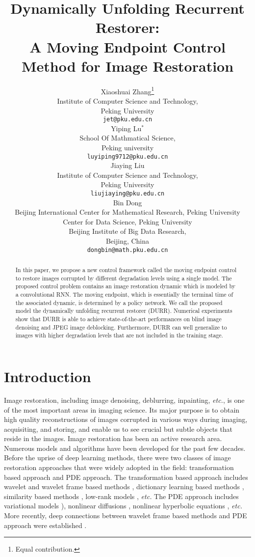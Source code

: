 \documentclass{article} %
\title{Dynamically Unfolding Recurrent Restorer:\\
A Moving Endpoint Control Method for Image Restoration}
\author{
	Xiaoshuai Zhang\thanks{Equal contribution.}\\
	Institute of Computer Science and Technology,\\
	Peking University\\
	\texttt{jet@pku.edu.cn} \\
	\And
	Yiping Lu$^*$ \\
	School Of Mathmatical Science,\\
	Peking university \\
	\texttt{luyiping9712@pku.edu.cn} \\
	\And
	Jiaying Liu \\
	Institute of Computer Science and Technology,\\
	Peking University\\
	\texttt{liujiaying@pku.edu.cn}\\
	\And
	Bin Dong \\
	Beijing International Center for Mathematical Research, Peking University\\
	Center for Data Science, Peking University\\
	Beijing Institute of Big Data Research,\\
	Beijing, China\\
	\texttt{dongbin@math.pku.edu.cn}\\
}
\begin{document}
\maketitle

\begin{abstract}
In this paper, we propose a new control framework called
the moving endpoint control to restore images corrupted by
different degradation levels using a single model. The proposed control problem
contains an image restoration dynamic which is modeled by a convolutional RNN.
The moving endpoint, which is essentially the terminal time of
the associated dynamic, is determined by a policy network. We call
the proposed model the dynamically unfolding recurrent restorer (DURR).
Numerical experiments show that DURR is able to achieve
state-of-the-art performances on blind image denoising and
JPEG image deblocking. Furthermore, DURR can well generalize to images with
higher degradation levels that are not included in the training stage.
\end{abstract}
\section{Introduction}

Image restoration, including image denoising, deblurring, inpainting,
\textit{etc.}, is one of the most important areas in imaging science.
Its major purpose is to obtain high quality reconstructions of images
corrupted in various ways during imaging, acquisiting, and storing,
and enable us to see crucial but subtle objects that reside in the images. Image restoration has been an active research area. Numerous models
and algorithms have been developed for the past few decades. Before
the uprise of deep learning methods, there were two classes of
image restoration approaches that were widely adopted in the field: transformation based approach and PDE approach. The transformation based
approach includes wavelet and wavelet frame based methods
\citep{elad2005simultaneous, starck2005image,
	daubechies2007iteratively,cai2009split},
dictionary learning based methods \citep{aharon2006rm}, similarity based methods
\citep{buades2005non,dabov2007image}, low-rank models
\citep{ji2010robust,gu2014weighted}, \textit{etc.}
The PDE approach includes variational models \citep{mumford1989optimal,
	rudin1992nonlinear,bredies2010total}), nonlinear diffusions
\citep{perona1990scale,catte1992image,weickert1998anisotropic},
nonlinear hyperbolic equations \citep{Osher1990}, \textit{etc.}
More recently, deep connections between wavelet frame based methods
and PDE approach were established \citep{cai2012image,
	cai2016image,dong2017image}.
\end{document}
